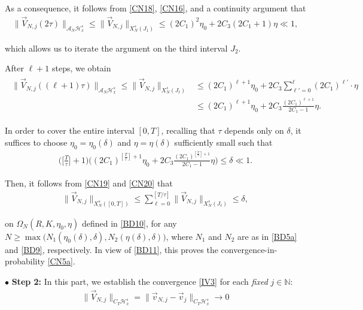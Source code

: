 \documentclass[letterpaper, 11pt,  reqno]{amsart}
\newcommand{\1}{\hspace{0.5mm}\text{I}\hspace{0.2mm}}
\newcommand{\noi}{\noindent}
\newcommand{\N}{\mathbb{N}}
\renewcommand{\H}{\mathcal{H}}
\newcommand{\dl}{\delta}
\newcommand{\A}{\mathcal{A}}
\newcommand{\too}{\longrightarrow}
\renewcommand{\O}{\Omega}
\renewcommand{\l}{\ell}
\numberwithin{equation}{section}
\numberwithin{theorem}{section}
\begin{document}
\noi
As a consequence, 
it follows from \eqref{CN18},  \eqref{CN16}, and a continuity argument 
 that 
\begin{align}
\|\vec  V_{N, j} (2\tau ) \|_{\A_N \H^s_x} 
\le 
\|\vec V_{N, j}\|_{X^s_{N}(J_1)}
\le 
 (2C_1)^2 \eta_0  + 2C_3 ( 2C_1 +1)  \eta \ll1, 
 \label{CN18a}
\end{align}

\noi
which allows us to iterate the argument on the third interval $J_2$.


After $\l +1$ steps, we obtain
\begin{align}
\begin{split}
\|\vec  V_{N, j} ((\l +1) \tau ) \|_{\A_N \H^s_x} 
\le 
\|\vec V_{N, j}\|_{X^s_{N}(J_\l )}
& \le 
 (2C_1)^{\l+1} \eta_0 +  
2C_3  \sum_{\l' = 0}^{\l} (2C_1)^{\l'} \cdot \eta\\
& \le  (2C_1)^{\l+1} \eta_0 +  
2C_3  
\frac { (2C_1)^{\l+1}}{2C_1 - 1}
\eta.
\end{split}
\label{CN19}
\end{align}

\noi
In order to cover the entire interval $[0, T]$, 
recalling that $\tau$ depends only on $\dl$, 
it suffices to choose 
 $\eta_0 = \eta_0(\dl)$ and  $\eta = \eta(\dl) $ sufficiently small
such that 
\begin{align}
\bigg(\Big[\frac T\tau\Big]+1\bigg)\bigg( (2C_1)^{[\frac T\tau]+1} \eta_0 +  
2C_3  
\frac { (2C_1)^{[\frac T\tau]+1}}{2C_1 - 1}
 \eta\bigg) \le \dl \ll 1.
\label{CN20}
\end{align}

\noi
Then, it follows from 
\eqref{CN19} and \eqref{CN20} that 
\begin{align}
\|\vec V_{N, j}\|_{X^s_N([0, T])}
\le
\sum_{\l = 0}^{[T/\tau]} 
\|\vec V_{N, j}\|_{X^s_{N}(J_\l )}
\le \dl, 
\label{CN21}
\end{align}


\noi
on $\O_N  (R, K, \eta_0, \eta)$
defined in \eqref{BD10}, 
for any 
 $N \ge \max \big(N_1(\eta_0(\dl), \dl), N_2(\eta(\dl), \dl)\big)$, 
 where $N_1$ and $N_2$ are as in 
 \eqref{BD5a} and  \eqref{BD9}, respectively.
In view of 
\eqref{BD11}, 
this proves
the 
convergence-in-probability 
\eqref{CN5a}.




\medskip

\noi
$\bullet$ {\bf Step 2:}
In this part, we establish the  convergence
\eqref{IV3}
for each {\it fixed}  $j \in \N$:
\begin{align}
\| \vec V_{N, j} \|_{C_T \H_x^s}
= \| \vec v_{N, j}  - \vec v_j \|_{C_T \H_x^s}
\too 0  
\label{DN1}
\end{align}
\end{document}
